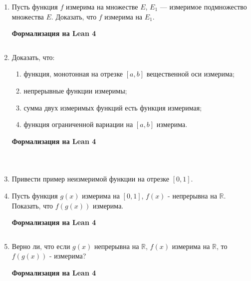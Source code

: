 \documentclass[12pt,a4paper]{article}
\begin{document}
\begin{enumerate}
\newpage
\item Пусть функция $f$ измерима на множестве $E$, $E_{1}$ — измеримое подмножество множества $E$. Доказать, что $f$ измерима на $E_{1}$.


\begin{center}\small\textbf{Формализация на Lean 4}\end{center}
\inputminted{lean}{FunAn/Section03_MeasurableFunctions/Task01.lean}

\newpage

\item Доказать, что:
\begin{enumerate}[label=\alph*)]
\item функция, монотонная на отрезке $[a, b]$ вещественной оси измерима;
\item непрерывные функции измеримы;
\item сумма двух измеримых функций есть функция измеримая;
\item функция ограниченной вариации на $[a, b]$ измерима.
\end{enumerate}


\begin{center}\small\textbf{Формализация на Lean 4}\end{center}
\inputminted{lean}{FunAn/Section03_MeasurableFunctions/Task02.lean}
\inputminted{lean}{FunAn/Section03_MeasurableFunctions/Task02a.lean}
\inputminted{lean}{FunAn/Section03_MeasurableFunctions/Task02d.lean}

\newpage

\item Привести пример неизмеримой функции на отрезке $[0, 1]$.

\newpage
\item Пусть функция $g(x)$ измерима на $[0,1]$, $f(x)$ - непрерывна на $\mathbb{R}$. Показать, что $f(g(x))$ измерима.


\begin{center}\small\textbf{Формализация на Lean 4}\end{center}
\inputminted{lean}{FunAn/Section03_MeasurableFunctions/Task04.lean}

\newpage
\item Верно ли, что если $g(x)$ непрерывна на $\mathbb{R}$, $f(x)$ измерима на $\mathbb{R}$, то $f(g(x))$ - измерима?


\begin{center}\small\textbf{Формализация на Lean 4}\end{center}
\inputminted{lean}{FunAn/Section03_MeasurableFunctions/Task05.lean}


\end{enumerate}
\end{document}
